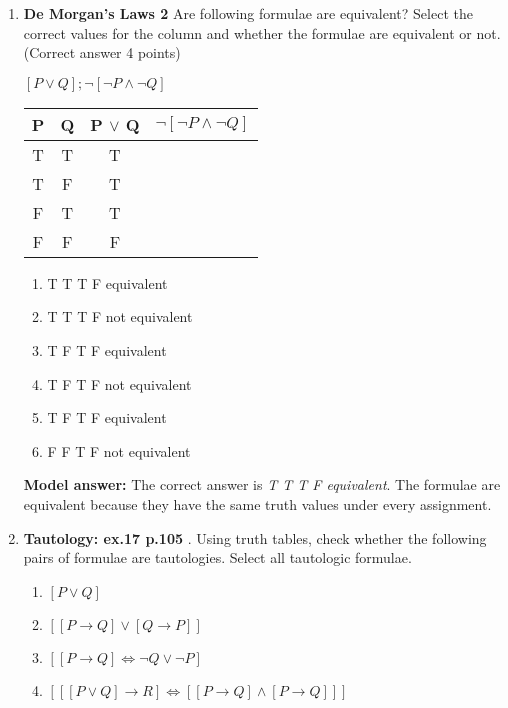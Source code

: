 \documentclass[a4,11pt]{article}
\begin{document}
\begin{enumerate}[leftmargin = 12pt]
\begin{tabular}{c | c | c | c | c | c | c}
\end{tabular}

{ \bf Model answer:} Two formulae are equivalent if they are have the same truth values under the exact same circumstances. $\neg$ (P $\land$ Q) is True whenever ($\neg$ P $\lor$ $\neg$ Q) is True, namely when either P or Q or both P and Q are false. $\neg$ (P $\land$ Q) is False whenever  ($\neg$ P $\lor$ $\neg$ Q) is False, namely when P and Q are true. Since the two formulae are true/false under the same circumstances, they are equivalent.




\item {\bf De Morgan's Laws 2} Are following formulae are equivalent? Select the correct values for the column and whether the formulae are equivalent or not. (Correct answer 4 points)

 $[P \lor Q]; \neg [ \neg P \land \neg Q]$


\begin{tabular}{c | c | c | c }
\hline \hline
P & Q & P $\lor$ Q & $\neg [ \neg P \land \neg Q]$ \\
\hline \hline
T & T & T \\
T & F & T \\
F & T & T \\
F & F & F \\
\hline \hline
\end{tabular}

\begin{enumerate}
\item T T T F equivalent
\item T T T F not equivalent
\item T F T F equivalent
\item T F T F not equivalent
\item T F T F equivalent
\item F F T F not equivalent
\end{enumerate}


{ \bf Model answer:} The correct answer is {\it T T T F equivalent}. The formulae are equivalent because they have the same truth values under every assignment.

\item {\bf Tautology: ex.17 p.105} . Using truth tables, check whether the following pairs of formulae are tautologies. Select all tautologic formulae.

\begin{enumerate}
\item $[P \lor Q]$
\item $[[P\rightarrow Q]  \lor  [Q \rightarrow P]]$
\item $[[P \rightarrow Q] \iff \neg Q \lor \neg P ]$ 
\item $[[[P \lor Q] \rightarrow  R] \iff [[P \rightarrow Q] \land [P \rightarrow  Q]]]$
\end{enumerate}



\end{enumerate}
\end{document}
